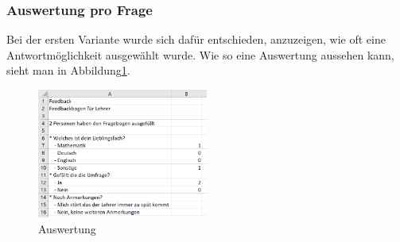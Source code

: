 \subsubsection{Auswertung pro Frage}
Bei der ersten Variante wurde sich dafür entschieden, anzuzeigen, wie oft eine Antwortmöglichkeit
ausgewählt wurde. Wie so eine Auswertung aussehen kann, sieht man in Abbildung\ref{fig:auswertungErgebnis1}.
\newline
\newline
\newline
\begin{figure}[h]
  \centering
    \includegraphics[width=0.5\textwidth]{pics/auswertung1.png}
    \caption{Auswertung}
    \label{fig:auswertungErgebnis1}
\end{figure}

